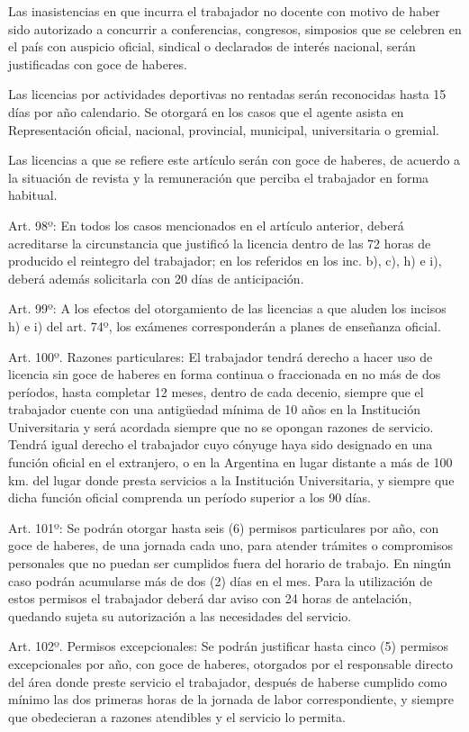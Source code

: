 \documentclass[]{article}
\begin{document}
Las inasistencias en que incurra el trabajador no docente con motivo de
haber sido autorizado a concurrir a conferencias, congresos, simposios
que se celebren en el país con auspicio oficial, sindical o declarados
de interés nacional, serán justificadas con goce de haberes.

Las licencias por actividades deportivas no rentadas serán reconocidas
hasta 15 días por año calendario. Se otorgará en los casos que el agente
asista en Representación oficial, nacional, provincial, municipal,
universitaria o gremial.

Las licencias a que se refiere este artículo serán con goce de haberes,
de acuerdo a la situación de revista y la remuneración que perciba el
trabajador en forma habitual.

Art. 98º: En todos los casos mencionados en el artículo anterior, deberá
acreditarse la circunstancia que justificó la licencia dentro de las 72
horas de producido el reintegro del trabajador; en los referidos en los
inc. b), c), h) e i), deberá además solicitarla con 20 días de
anticipación.

Art. 99º: A los efectos del otorgamiento de las licencias a que aluden
los incisos h) e i) del art. 74º, los exámenes corresponderán a planes
de enseñanza oficial.

Art. 100º. Razones particulares: El trabajador tendrá derecho a hacer
uso de licencia sin goce de haberes en forma continua o fraccionada en
no más de dos períodos, hasta completar 12 meses, dentro de cada
decenio, siempre que el trabajador cuente con una antigüedad mínima de
10 años en la Institución Universitaria y será acordada siempre que no
se opongan razones de servicio. Tendrá igual derecho el trabajador cuyo
cónyuge haya sido designado en una función oficial en el extranjero, o
en la Argentina en lugar distante a más de 100 km. del lugar donde
presta servicios a la Institución Universitaria, y siempre que dicha
función oficial comprenda un período superior a los 90 días.

Art. 101º: Se podrán otorgar hasta seis (6) permisos particulares por
año, con goce de haberes, de una jornada cada uno, para atender trámites
o compromisos personales que no puedan ser cumplidos fuera del horario
de trabajo. En ningún caso podrán acumularse más de dos (2) días en el
mes. Para la utilización de estos permisos el trabajador deberá dar
aviso con 24 horas de antelación, quedando sujeta su autorización a las
necesidades del servicio.

Art. 102º. Permisos excepcionales: Se podrán justificar hasta cinco (5)
permisos excepcionales por año, con goce de haberes, otorgados por el
responsable directo del área donde preste servicio el trabajador,
después de haberse cumplido como mínimo las dos primeras horas de la
jornada de labor correspondiente, y siempre que obedecieran a razones
atendibles y el servicio lo permita.
\end{document}
